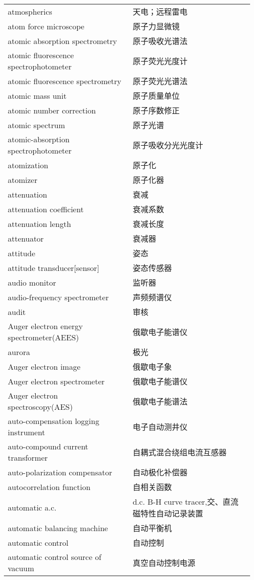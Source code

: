 \documentclass[
]{article}
\begin{document}
\begin{longtable}[]{@{}ll@{}}
atmospherics & 天电；远程雷电 \\
atom force microscope & 原子力显微镜 \\
atomic absorption spectrometry & 原子吸收光谱法 \\
atomic fluorescence spectrophotometer & 原子荧光光度计 \\
atomic fluorescence spectrometry & 原子荧光光谱法 \\
atomic mass unit & 原子质量单位 \\
atomic number correction & 原子序数修正 \\
atomic spectrum & 原子光谱 \\
atomic-absorption spectrophotometer & 原子吸收分光光度计 \\
atomization & 原子化 \\
atomizer & 原子化器 \\
attenuation & 衰减 \\
attenuation coefficient & 衰减系数 \\
attenuation length & 衰减长度 \\
attenuator & 衰减器 \\
attitude & 姿态 \\
attitude transducer{[}sensor{]} & 姿态传感器 \\
audio monitor & 监听器 \\
audio-frequency spectrometer & 声频频谱仪 \\
audit & 审核 \\
Auger electron energy spectrometer(AEES) & 俄歇电子能谱仪 \\
aurora & 极光 \\
Auger electron image & 俄歇电子象 \\
Auger electron spectrometer & 俄歇电子能谱仪 \\
Auger electron spectroscopy(AES) & 俄歇电子能谱法 \\
auto-compensation logging instrument & 电子自动测井仪 \\
auto-compound current transformer & 自耦式混合绕组电流互感器 \\
auto-polarization compensator & 自动极化补偿器 \\
autocorrelation function & 自相关函数 \\
automatic a.c. & d.c. B-H curve tracer,交、直流磁特性自动记录装置 \\
automatic balancing machine & 自动平衡机 \\
automatic control & 自动控制 \\
automatic control source of vacuum & 真空自动控制电源 \\

\end{longtable}
\end{document}
